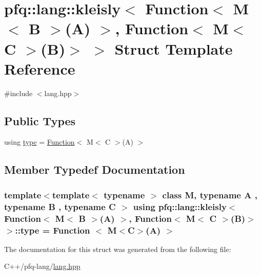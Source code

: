 \hypertarget{structpfq_1_1lang_1_1kleisly_3_01Function_3_01M_3_01B_01_4_07A_08_01_4_00_01Function_3_01M_3_01C_01_4_07B_08_4_01_4}{\section{pfq\+:\+:lang\+:\+:kleisly$<$ Function$<$ M$<$ B $>$(A) $>$, Function$<$ M$<$ C $>$(B)$>$ $>$ Struct Template Reference}
\label{structpfq_1_1lang_1_1kleisly_3_01Function_3_01M_3_01B_01_4_07A_08_01_4_00_01Function_3_01M_3_01C_01_4_07B_08_4_01_4}
}


{\ttfamily \#include $<$lang.\+hpp$>$}

\subsection*{Public Types}
\begin{DoxyCompactItemize}
\item 
using \hyperlink{structpfq_1_1lang_1_1kleisly_3_01Function_3_01M_3_01B_01_4_07A_08_01_4_00_01Function_3_01M_3_01C_01_4_07B_08_4_01_4_add8114ae2219624ca829d1409d6695bc}{type} = \hyperlink{structpfq_1_1lang_1_1Function}{Function}$<$ M$<$ C $>$(A) $>$
\end{DoxyCompactItemize}


\subsection{Member Typedef Documentation}
\hypertarget{structpfq_1_1lang_1_1kleisly_3_01Function_3_01M_3_01B_01_4_07A_08_01_4_00_01Function_3_01M_3_01C_01_4_07B_08_4_01_4_add8114ae2219624ca829d1409d6695bc}{
\subsubsection[{type}]{\setlength{\rightskip}{0pt plus 5cm}template$<$template$<$ typename $>$ class M, typename A , typename B , typename C $>$ using {\bf pfq\+::lang\+::kleisly}$<$ {\bf Function}$<$ M$<$ B $>$(A) $>$, {\bf Function}$<$ M$<$ C $>$(B)$>$ $>$\+::{\bf type} =  {\bf Function} $<$ M$<$C$>$(A) $>$}}\label{structpfq_1_1lang_1_1kleisly_3_01Function_3_01M_3_01B_01_4_07A_08_01_4_00_01Function_3_01M_3_01C_01_4_07B_08_4_01_4_add8114ae2219624ca829d1409d6695bc}


The documentation for this struct was generated from the following file\+:\begin{DoxyCompactItemize}
\item 
C++/pfq-\/lang/\hyperlink{lang_8hpp}{lang.\+hpp}\end{DoxyCompactItemize}
